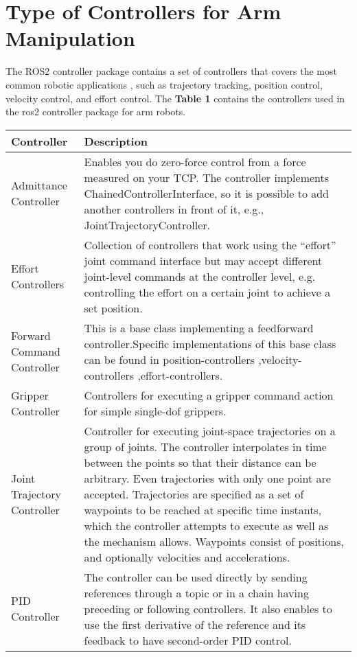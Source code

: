 \section{Type of Controllers for Arm Manipulation}

The ROS2 controller package contains a set of controllers that covers the most common robotic applications , such as trajectory tracking, position control, velocity control, and effort control.
The \textbf{Table 1}\cite{ros2controllers} contains the controllers used in the ros2 controller package for arm robots.

\begin{table}[h!]
    \centering
    \begin{tabular}{|l|p{10cm}|}
    \hline
    \textbf{Controller} & \textbf{Description} \\
    \hline
    Admittance Controller & Enables you do zero-force control from a force measured on your TCP. The controller implements ChainedControllerInterface, so it is possible to add another controllers in front of it, e.g., JointTrajectoryController. \\
    \hline
    Effort Controllers & Collection of controllers that work using the “effort” joint command interface but may accept different joint-level commands at the controller level, e.g. controlling the effort on a certain joint to achieve a set position. \\
    \hline
    Forward Command Controller & This is a base class implementing a feedforward controller.Specific implementations of this base class can be found in position-controllers ,velocity-controllers ,effort-controllers. \\
    \hline
    Gripper Controller & Controllers for executing a gripper command action for simple single-dof grippers. \\
    \hline
    Joint Trajectory Controller & Controller for executing joint-space trajectories on a group of joints. The controller interpolates in time between the points so that their distance can be arbitrary. Even trajectories with only one point are accepted. Trajectories are specified as a set of waypoints to be reached at specific time instants, which the controller attempts to execute as well as the mechanism allows. Waypoints consist of positions, and optionally velocities and accelerations. \\
    \hline
    PID Controller & The controller can be used directly by sending references through a topic or in a chain having preceding or following controllers. It also enables to use the first derivative of the reference and its feedback to have second-order PID control. \\

\end{tabular}
\end{table}
